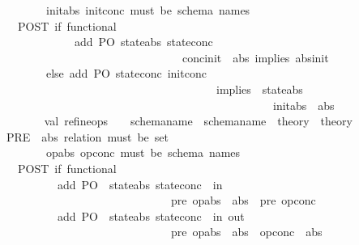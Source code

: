 \begin{isabellebody}
\ \ \ \ \ \ \ \ \ \ \ \ \ \ \ init{\isacharunderscore}abs\ init{\isacharunderscore}conc\ must\ be\ schema\ names{\isachardot}\isanewline
\ \ \ \ \ \ \ \ \ \ POST\ if\ functional{\isacharcolon}\isanewline
\ \ \ \ \ \ \ \ \ \ \ \ \ \ \ \ \ \ \ \ add\ PO{\isacharcolon}{\isachardoublequote}{\isasymSforall}\ state{\isacharunderscore}abs\ state{\isacharunderscore}conc{\isachardot}\ \isanewline
\ \ \ \ \ \ \ \ \ \ \ \ \ \ \ \ \ \ \ \ \ \ \ \ \ \ \ \ \ \ \ \ \ \ \ \ \ \ \ conc{\isacharunderscore}init\ {\isacharampersand}\ abs\ {\isacharbackslash}implies\ abs{\isacharunderscore}init{\isachardoublequote}\ \ \isanewline
\ \ \ \ \ \ \ \ \ \ \ \ \ \ \ else\ add\ PO{\isacharcolon}{\isachardoublequote}{\isasymSforall}\ state{\isacharunderscore}conc{\isachardot}\ init{\isacharunderscore}conc\ \isanewline
\ \ \ \ \ \ \ \ \ \ \ \ \ \ \ \ \ \ \ \ \ \ \ \ \ \ \ \ \ \ \ \ \ \ \ \ \ \ \ \ \ \ \ \ \ {\isacharbackslash}implies\ {\isacharparenleft}{\isasymSexists}\ state{\isacharunderscore}abs{\isachardot}\ \isanewline
\ \ \ \ \ \ \ \ \ \ \ \ \ \ \ \ \ \ \ \ \ \ \ \ \ \ \ \ \ \ \ \ \ \ \ \ \ \ \ \ \ \ \ \ \ \ \ \ \ \ \ \ \ \ \ init{\isacharunderscore}abs\ {\isacharampersand}\ abs{\isacharparenright}{\isachardoublequote}\isanewline
\ \ \ \ \ \ \ \ {\isacharasterisk}{\isacharparenright}\isanewline
\ \ \ \ \ \ val\ refine{\isacharunderscore}ops\ \ \ {\isacharcolon}\ schema{\isacharunderscore}name\ {\isacharasterisk}\ schema{\isacharunderscore}name\ {\isacharminus}{\isachargreater}\ theory\ {\isacharminus}{\isachargreater}\ theory\isanewline
\ \ \ \ \ \ \ {\isacharparenleft}{\isacharasterisk}\ PRE\ \ abs\ relation\ must\ be\ set{\isachardot}\isanewline
\ \ \ \ \ \ \ \ \ \ \ \ \ \ \ op{\isacharunderscore}abs\ op{\isacharunderscore}conc\ must\ be\ schema\ names{\isachardot}\isanewline
\ \ \ \ \ \ \ \ \ \ POST\ if\ functional{\isacharcolon}\isanewline
\ \ \ \ \ \ \ \ \ \ \ \ \ \ \ \ \ add\ PO{\isacharcolon}\ {\isasymSforall}\ state{\isacharunderscore}abs\ state{\isacharunderscore}conc{\isachardot}\ {\isasymforall}\ in{\isachardot}\ \isanewline
\ \ \ \ \ \ \ \ \ \ \ \ \ \ \ \ \ \ \ \ \ \ \ \ \ \ \ \ \ \ \ \ \ \ \ \ \ pre\ op{\isacharunderscore}abs\ {\isasymand}\ abs\ {\isasymlongrightarrow}\ pre\ op{\isacharunderscore}conc\isanewline
\ \ \ \ \ \ \ \ \ \ \ \ \ \ \ \ \ add\ PO{\isacharcolon}\ {\isasymSforall}\ state{\isacharunderscore}abs\ state{\isacharunderscore}conc{\isachardot}\ {\isasymforall}\ in\ out{\isachardot}\ \isanewline
\ \ \ \ \ \ \ \ \ \ \ \ \ \ \ \ \ \ \ \ \ \ \ \ \ \ \ \ \ \ \ \ \ \ \ \ \ pre\ op{\isacharunderscore}abs\ {\isasymand}\ abs\ {\isasymand}\ op{\isacharunderscore}conc\ {\isasymand}\ abs{\isacharprime}\ \isanewline

\end{isabellebody}
